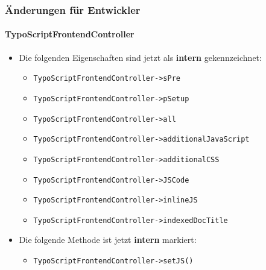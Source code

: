\begin{frame}[fragile]
	\frametitle{Änderungen für Entwickler}
	\framesubtitle{TypoScriptFrontendController}

	\begin{itemize}
		\item Die folgenden Eigenschaften sind jetzt als \textbf{intern} gekennzeichnet:
			\begin{itemize}
				\item \texttt{TypoScriptFrontendController->sPre}
				\item \texttt{TypoScriptFrontendController->pSetup}
				\item \texttt{TypoScriptFrontendController->all}
				\item \texttt{TypoScriptFrontendController->additionalJavaScript}
				\item \texttt{TypoScriptFrontendController->additionalCSS}
				\item \texttt{TypoScriptFrontendController->JSCode}
				\item \texttt{TypoScriptFrontendController->inlineJS}
				\item \texttt{TypoScriptFrontendController->indexedDocTitle}
			\end{itemize}

		\item Die folgende Methode ist jetzt \textbf{intern} markiert:

			\begin{itemize}
				\item \texttt{TypoScriptFrontendController->setJS()}
			\end{itemize}

	\end{itemize}

\end{frame}


